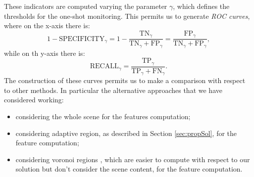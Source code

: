 \documentclass{llncs}
\newcommand{\gi}[1]{{\textcolor{red}{[\small \textbf{Giacomo}: #1]}}}
\begin{document}
These indicators are computed varying the parameter $\gamma$, which defines the thresholds for the one-shot monitoring. 
This permits us to generate \textit{ROC curves}, where on the x-axis there is:
\[1-\text{SPECIFICITY}_\gamma = 1-\frac{\text{TN}_\gamma}{\text{TN}_\gamma+\text{FP}_\gamma}=\frac{\text{FP}_\gamma}{\text{TN}_\gamma+\text{FP}_\gamma},\]
while on th y-axis there is:
\[\text{RECALL}_\gamma=\frac{\text{TP}_\gamma}{\text{TP}_\gamma+\text{FN}_\gamma}.\]
The construction of these curves permits us to make a comparison with respect to other methods.
In particular the alternative approaches that we have considered working:
\begin{itemize}
\item considering the whole scene for the features computation;
\item considering adaptive region, as described in Section \ref{sec:propSol}, for the feature computation;
\item considering voronoi regions \cite{aurenhammer1991voronoi}, which are easier to compute with respect to our solution but don't consider the scene content, for the feature computation.
\end{itemize}
%
%
%
%
\end{document}
